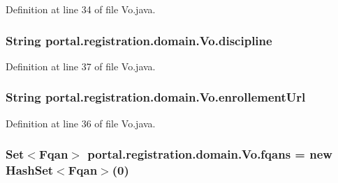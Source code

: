 Definition at line 34 of file Vo.java.

\hypertarget{classportal_1_1registration_1_1domain_1_1Vo_ab5ce7543fdba244953f198d31d367723}{
\subsubsection[{discipline}]{\setlength{\rightskip}{0pt plus 5cm}String {\bf portal.registration.domain.Vo.discipline}}}
\label{classportal_1_1registration_1_1domain_1_1Vo_ab5ce7543fdba244953f198d31d367723}


Definition at line 37 of file Vo.java.

\hypertarget{classportal_1_1registration_1_1domain_1_1Vo_ad9cd8c77be188df99d145d515c7249c7}{
\subsubsection[{enrollementUrl}]{\setlength{\rightskip}{0pt plus 5cm}String {\bf portal.registration.domain.Vo.enrollementUrl}}}
\label{classportal_1_1registration_1_1domain_1_1Vo_ad9cd8c77be188df99d145d515c7249c7}


Definition at line 36 of file Vo.java.

\hypertarget{classportal_1_1registration_1_1domain_1_1Vo_ac9fbb476da6a7943923272ceaee88bf8}{
\subsubsection[{fqans}]{\setlength{\rightskip}{0pt plus 5cm}Set$<${\bf Fqan}$>$ {\bf portal.registration.domain.Vo.fqans} = new HashSet$<${\bf Fqan}$>$(0)}}
\label{classportal_1_1registration_1_1domain_1_1Vo_ac9fbb476da6a7943923272ceaee88bf8}


